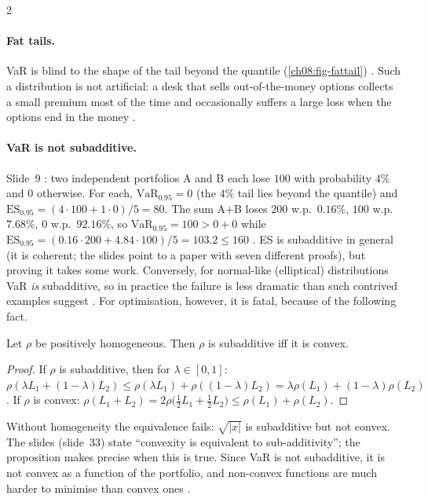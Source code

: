 \begin{paracol}{2}
\paragraph{Fat tails.} VaR is blind to the shape of the tail beyond the quantile (\cref{ch08:fig-fattail})
. Such a distribution is not artificial: a desk that sells out-of-the-money options collects a
small premium most of the time and occasionally suffers a large loss when the options end in the money
.

\paragraph{VaR is not subadditive.} Slide~9 : two independent portfolios A and B each lose $100$
with probability $4\%$ and $0$ otherwise. For each, $\mathrm{VaR}_{0.95}=0$ (the $4\%$ tail lies beyond the
quantile) and $\mathrm{ES}_{0.95}=(4\cdot100+1\cdot0)/5=80$. The sum A+B loses $200$ w.p.\ $0.16\%$, $100$ w.p.\
$7.68\%$, $0$ w.p.\ $92.16\%$, so $\mathrm{VaR}_{0.95}=100>0+0$ while $\mathrm{ES}_{0.95}=(0.16\cdot200+4.84\cdot100)/5
=103.2\le160$ \ts{24}{10}{15:39}. ES is subadditive in general (it is coherent; the slides point to a paper with
seven different proofs), but proving it takes some work. Conversely, for normal-like (elliptical) distributions
VaR \emph{is} subadditive, so in practice the failure is less dramatic than such contrived examples suggest
\ts{24}{10}{16:45}. For optimisation, however, it is fatal, because of the following fact.

\begin{proposition}\label{ch08:prop-convex}
Let $\rho$ be positively homogeneous. Then $\rho$ is subadditive iff it is convex.
\end{proposition}
\begin{proof}
If $\rho$ is subadditive, then for $\lambda\in[0,1]$:
$\rho(\lambda L_1+(1-\lambda)L_2)\le\rho(\lambda L_1)+\rho((1-\lambda)L_2)=\lambda\rho(L_1)+(1-\lambda)\rho(L_2)$.
If $\rho$ is convex: $\rho(L_1+L_2)=2\rho\bigl(\tfrac12L_1+\tfrac12L_2\bigr)\le\rho(L_1)+\rho(L_2)$.
\end{proof}
Without homogeneity the equivalence fails: $\sqrt{|x|}$ is subadditive but not convex. The slides (slide~33) state
``convexity is equivalent to sub-additivity''; the proposition makes precise when this is true.
Since VaR is not subadditive, it is not convex as a function of the portfolio, and non-convex functions are much
harder to minimise than convex ones \ts{24}{10}{16:45}.


\end{paracol}
